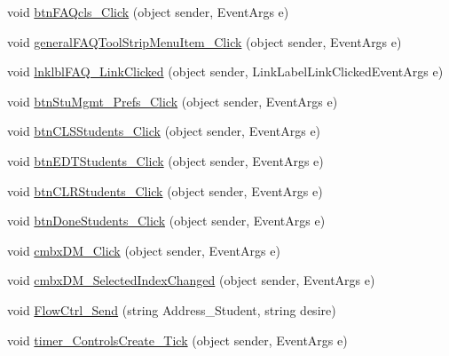 \begin{DoxyCompactItemize}
\item 
void \hyperlink{class_sr_p___classroom_inq_1_1frm_classrrom_inq_a93a45d68634c479c06af534ed4afc931}{btn\-F\-A\-Qcls\-\_\-\-Click} (object sender, \-Event\-Args e)
\item 
void \hyperlink{class_sr_p___classroom_inq_1_1frm_classrrom_inq_ac3c424bfd93cbc8139b68630e94c1317}{general\-F\-A\-Q\-Tool\-Strip\-Menu\-Item\-\_\-\-Click} (object sender, \-Event\-Args e)
\item 
void \hyperlink{class_sr_p___classroom_inq_1_1frm_classrrom_inq_a49fb3826a76731f1fed16eb3dd473bb6}{lnklbl\-F\-A\-Q\-\_\-\-Link\-Clicked} (object sender, \-Link\-Label\-Link\-Clicked\-Event\-Args e)
\item 
void \hyperlink{class_sr_p___classroom_inq_1_1frm_classrrom_inq_a498e01ce0af00872271b09d5aa621e38}{btn\-Stu\-Mgmt\-\_\-\-Prefs\-\_\-\-Click} (object sender, \-Event\-Args e)
\item 
void \hyperlink{class_sr_p___classroom_inq_1_1frm_classrrom_inq_a84063ccbe84b1c95a224444f0b43ccd1}{btn\-C\-L\-S\-Students\-\_\-\-Click} (object sender, \-Event\-Args e)
\item 
void \hyperlink{class_sr_p___classroom_inq_1_1frm_classrrom_inq_a589f749ca29e7874f8dc92b06060f72a}{btn\-E\-D\-T\-Students\-\_\-\-Click} (object sender, \-Event\-Args e)
\item 
void \hyperlink{class_sr_p___classroom_inq_1_1frm_classrrom_inq_ad9679cab85677e96603f27eb5630e3be}{btn\-C\-L\-R\-Students\-\_\-\-Click} (object sender, \-Event\-Args e)
\item 
void \hyperlink{class_sr_p___classroom_inq_1_1frm_classrrom_inq_a7aa5b8355b30dbfd5a4e1990cd8864b5}{btn\-Done\-Students\-\_\-\-Click} (object sender, \-Event\-Args e)
\item 
void \hyperlink{class_sr_p___classroom_inq_1_1frm_classrrom_inq_a105ddb3794784250c1beb387646a9987}{cmbx\-D\-M\-\_\-\-Click} (object sender, \-Event\-Args e)
\item 
void \hyperlink{class_sr_p___classroom_inq_1_1frm_classrrom_inq_a40bf38cbcd4b97f6a32a4f10ea1e6f94}{cmbx\-D\-M\-\_\-\-Selected\-Index\-Changed} (object sender, \-Event\-Args e)
\item 
void \hyperlink{class_sr_p___classroom_inq_1_1frm_classrrom_inq_a86afd1a828832b2cd08c3570a05c6047}{\-Flow\-Ctrl\-\_\-\-Send} (string \-Address\-\_\-\-Student, string desire)
\item 
void \hyperlink{class_sr_p___classroom_inq_1_1frm_classrrom_inq_af03934d96e1bb39c2a01e4f766ed8702}{timer\-\_\-\-Controls\-Create\-\_\-\-Tick} (object sender, \-Event\-Args e)

\end{DoxyCompactItemize}
